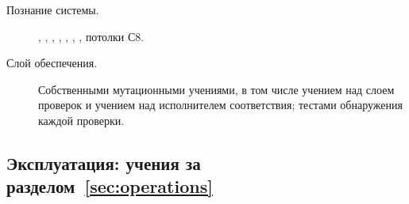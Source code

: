 {\begin{description}
  \item[Познание системы.] , , , , , , , потолки С8.
  \item[Слой обеспечения.] Собственными мутационными учениями, в том числе учением над слоем проверок и учением
над исполнителем соответствия; тестами обнаружения каждой проверки.
\end{description}
}

\subsection*{Эксплуатация: учения за разделом~\ref{sec:operations}}

